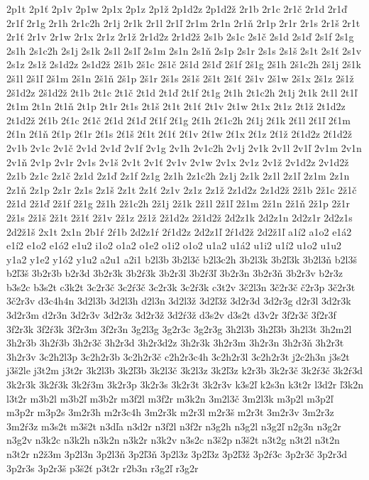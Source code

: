 {2p1t
2p1ť
2p1v
2p1w
2p1x
2p1z
2p1ž
2p1d2z
2p1d2ž
2r1b
2r1c
2r1č
2r1d
2r1ď
2r1f
2r1g
2r1h
2r1c2h
2r1j
2r1k
2r1l
2r1ľ
2r1m
2r1n
2r1ň
2r1p
2r1r
2r1s
2r1š
2r1t
2r1ť
2r1v
2r1w
2r1x
2r1z
2r1ž
2r1d2z
2r1d2ž
2s1b
2s1c
2s1č
2s1d
2s1ď
2s1f
2s1g
2s1h
2s1c2h
2s1j
2s1k
2s1l
2s1ľ
2s1m
2s1n
2s1ň
2s1p
2s1r
2s1s
2s1š
2s1t
2s1ť
2s1v
2s1z
2s1ž
2s1d2z
2s1d2ž
2š1b
2š1c
2š1č
2š1d
2š1ď
2š1f
2š1g
2š1h
2š1c2h
2š1j
2š1k
2š1l
2š1ľ
2š1m
2š1n
2š1ň
2š1p
2š1r
2š1s
2š1š
2š1t
2š1ť
2š1v
2š1w
2š1x
2š1z
2š1ž
2š1d2z
2š1d2ž
2t1b
2t1c
2t1č
2t1d
2t1ď
2t1f
2t1g
2t1h
2t1c2h
2t1j
2t1k
2t1l
2t1ľ
2t1m
2t1n
2t1ň
2t1p
2t1r
2t1s
2t1š
2t1t
2t1ť
2t1v
2t1w
2t1x
2t1z
2t1ž
2t1d2z
2t1d2ž
2ť1b
2ť1c
2ť1č
2ť1d
2ť1ď
2ť1f
2ť1g
2ť1h
2ť1c2h
2ť1j
2ť1k
2ť1l
2ť1ľ
2ť1m
2ť1n
2ť1ň
2ť1p
2ť1r
2ť1s
2ť1š
2ť1t
2ť1ť
2ť1v
2ť1w
2ť1x
2ť1z
2ť1ž
2ť1d2z
2ť1d2ž
2v1b
2v1c
2v1č
2v1d
2v1ď
2v1f
2v1g
2v1h
2v1c2h
2v1j
2v1k
2v1l
2v1ľ
2v1m
2v1n
2v1ň
2v1p
2v1r
2v1s
2v1š
2v1t
2v1ť
2v1v
2v1w
2v1x
2v1z
2v1ž
2v1d2z
2v1d2ž
2z1b
2z1c
2z1č
2z1d
2z1ď
2z1f
2z1g
2z1h
2z1c2h
2z1j
2z1k
2z1l
2z1ľ
2z1m
2z1n
2z1ň
2z1p
2z1r
2z1s
2z1š
2z1t
2z1ť
2z1v
2z1z
2z1ž
2z1d2z
2z1d2ž
2ž1b
2ž1c
2ž1č
2ž1d
2ž1ď
2ž1f
2ž1g
2ž1h
2ž1c2h
2ž1j
2ž1k
2ž1l
2ž1ľ
2ž1m
2ž1n
2ž1ň
2ž1p
2ž1r
2ž1s
2ž1š
2ž1t
2ž1ť
2ž1v
2ž1z
2ž1ž
2ž1d2z
2ž1d2ž
2d2z1k
2d2z1n
2d2z1r
2d2z1s
2d2ž1š
2x1t
2x1n
2b1ŕ
2ŕ1b
2d2z1ŕ
2ŕ1d2z
2d2z1ľ
2ŕ1d2ž
2d2ž1ľ
a1í2
a1o2
e1á2
e1í2
e1o2
e1ó2
e1u2
i1o2
o1a2
o1e2
o1i2
o1o2
u1a2
u1á2
u1i2
u1í2
u1o2
u1u2
y1a2
y1e2
y1ó2
y1u2
a2u1
a2i1
b2l3b
3b2l3č
b2l3c2h
3b2l3k
3b2ľ3k
3b2l3ň
b2l3š
b2ľ3š
3b2r3b
b2r3d
3b2r3k
3b2ŕ3k
3b2r3l
3b2ŕ3ľ
3b2r3n
3b2r3ň
3b2r3v
b2r3z
b3s2c
b3s2t
c3k2t
3c2r3č
3c2ŕ3č
3c2r3k
3c2ŕ3k
c3t2v
3č2l3n
3č2r3č
č2r3p
3č2r3t
3č2r3v
d3c4h4n
3d2l3b
3d2l3h
d2l3n
3d2l3ž
3d2ľ3ž
3d2r3d
3d2r3g
d2r3l
3d2r3k
3d2r3m
d2r3n
3d2r3v
3d2r3z
3d2r3ž
3d2ŕ3ž
d3s2v
d3s2t
d3v2r
3f2r3č
3f2r3f
3f2r3k
3f2ŕ3k
3f2r3m
3f2r3n
3g2l3g
3g2r3c
3g2r3g
3h2l3b
3h2ľ3b
3h2l3t
3h2m2l
3h2r3b
3h2ŕ3b
3h2r3č
3h2r3d
3h2r3d2z
3h2r3k
3h2r3m
3h2r3n
3h2r3ň
3h2r3t
3h2r3v
3c2h2l3p
3c2h2r3b
3c2h2r3č
c2h2r3c4h
3c2h2r3l
3c2h2r3t
j2c2h3n
j3s2t
j3š2le
j3t2m
j3t2r
3k2l3b
3k2ľ3b
3k2l3č
3k2l3z
3k2ľ3z
k2r3b
3k2r3č
3k2ŕ3č
3k2ŕ3d
3k2r3k
3k2ŕ3k
3k2ŕ3m
3k2r3p
3k2r3s
3k2r3t
3k2r3v
k3s2ľ
k2s3n
k3t2r
l3d2r
ľ3k2n
l3t2r
m3b2l
m3b2ľ
m3b2r
m3f2l
m3f2r
m3k2n
3m2l3č
3m2l3k
m3p2l
m3p2ľ
m3p2r
m3p2s
3m2r3h
m2r3c4h
3m2r3k
m2r3l
m2r3š
m2r3t
3m2r3v
3m2r3z
3m2ŕ3z
m3s2t
m3š2t
n3dľa
n3d2r
n3f2l
n3f2r
n3g2h
n3g2l
n3g2ľ
n2g3n
n3g2r
n3g2v
n3k2c
n3k2h
n3k2n
n3k2r
n3k2v
n3s2c
n3š2p
n3š2t
n3t2g
n3t2l
n3t2n
n3t2r
n2ž3m
3p2l3n
3p2l3ň
3p2ľ3ň
3p2l3z
3p2ľ3z
3p2ľ3ž
3p2ŕ3c
3p2r3č
3p2r3d
3p2r3s
3p2r3š
p3š2ť
p3t2r
r2b3n
r3g2ľ
r3g2r
}
